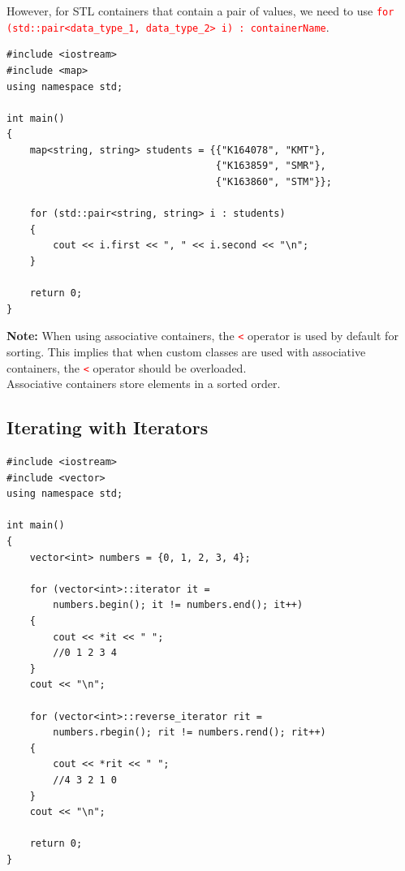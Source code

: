 \documentclass[12pt]{article}
\begin{document}
\noindent However, for STL containers that contain a pair of values, we need to use \textcolor{red}{\texttt{for (std::pair<data\_type\_1, data\_type\_2> i) : containerName}}. 

\begin{verbatim}
#include <iostream>
#include <map>
using namespace std;

int main()
{	
    map<string, string> students = {{"K164078", "KMT"}, 
                                    {"K163859", "SMR"}, 
                                    {"K163860", "STM"}};

    for (std::pair<string, string> i : students)
    {
        cout << i.first << ", " << i.second << "\n";
    }

    return 0;
}
\end{verbatim}

\vspace{1cm}

\noindent \textbf{Note:} When using associative containers, the \textcolor{red}{\texttt{<}} operator is used by default for sorting. This implies that when custom classes are used with 
associative containers, the \textcolor{red}{\texttt{<}} operator should be overloaded. \\

\noindent Associative containers store elements in a sorted order. \\





\newpage
{}
\subsection*{Iterating with Iterators}

\begin{verbatim}
#include <iostream>
#include <vector>
using namespace std;

int main()
{
    vector<int> numbers = {0, 1, 2, 3, 4};

    for (vector<int>::iterator it = 
        numbers.begin(); it != numbers.end(); it++)
    {
        cout << *it << " ";
        //0 1 2 3 4
    }
    cout << "\n";

    for (vector<int>::reverse_iterator rit = 
        numbers.rbegin(); rit != numbers.rend(); rit++)
    {
        cout << *rit << " ";
        //4 3 2 1 0
    }
    cout << "\n";	

    return 0;
}
\end{verbatim}
\end{document}
